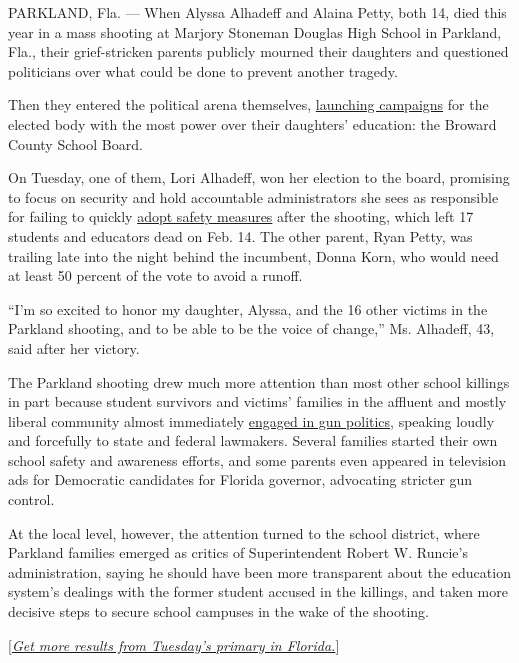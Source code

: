 PARKLAND, Fla. --- When Alyssa Alhadeff and Alaina Petty, both 14, died
this year in a mass shooting at Marjory Stoneman Douglas High School in
Parkland, Fla., their grief-stricken parents publicly mourned their
daughters and questioned politicians over what could be done to prevent
another tragedy.

Then they entered the political arena themselves,
\href{https://www.nytimes3xbfgragh.onion/2018/05/15/us/parkland-parents-school-board.html}{launching
campaigns} for the elected body with the most power over their
daughters' education: the Broward County School Board.

On Tuesday, one of them, Lori Alhadeff, won her election to the board,
promising to focus on security and hold accountable administrators she
sees as responsible for failing to quickly
\href{https://www.nytimes3xbfgragh.onion/2018/08/11/us/back-to-school-security-guns.html}{adopt
safety measures} after the shooting, which left 17 students and
educators dead on Feb. 14. The other parent, Ryan Petty, was trailing
late into the night behind the incumbent, Donna Korn, who would need at
least 50 percent of the vote to avoid a runoff.

``I'm so excited to honor my daughter, Alyssa, and the 16 other victims
in the Parkland shooting, and to be able to be the voice of change,''
Ms. Alhadeff, 43, said after her victory.

The Parkland shooting drew much more attention than most other school
killings in part because student survivors and victims' families in the
affluent and mostly liberal community almost immediately
\href{https://www.nytimes3xbfgragh.onion/2018/08/15/us/politics/parkland-students-voting.html}{engaged
in gun politics}, speaking loudly and forcefully to state and federal
lawmakers. Several families started their own school safety and
awareness efforts, and some parents even appeared in television ads for
Democratic candidates for Florida governor, advocating stricter gun
control.

At the local level, however, the attention turned to the school
district, where Parkland families emerged as critics of Superintendent
Robert W. Runcie's administration, saying he should have been more
transparent about the education system's dealings with the former
student accused in the killings, and taken more decisive steps to secure
school campuses in the wake of the shooting.

{[}\emph{\href{https://www.nytimes3xbfgragh.onion/2018/08/28/us/politics/florida-arizona-election-results.html}{Get
more results from Tuesday's primary in Florida.}}{]}


